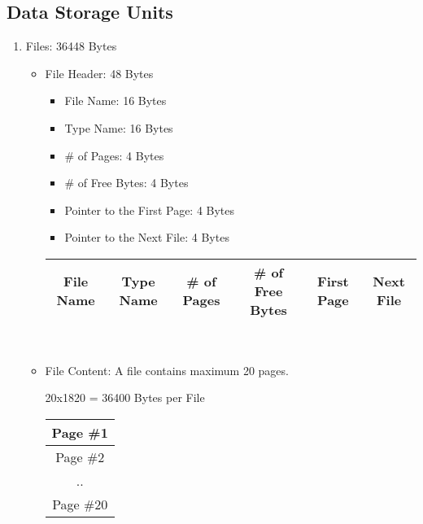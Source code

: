 \documentclass[12pt]{article}
\begin{document}
\subsection{Data Storage Units}
\begin{enumerate}
    \item Files: 36448 Bytes
        \begin{itemize}
            \item File Header: 48 Bytes
            \begin{itemize}
                \item File Name: 16 Bytes
                \item Type Name: 16 Bytes
                \item \# of Pages: 4 Bytes
                \item \# of Free Bytes: 4 Bytes
                \item Pointer to the First Page: 4 Bytes
                \item Pointer to the Next File: 4 Bytes
            \end{itemize}
            
            \begin{tabular}{|c|c|c|c|c|c|}
                \hline
                File Name & Type Name & \# of Pages & \# of Free Bytes & First Page & Next File \\
                \hline
            \end{tabular}
            \\
            \item File Content: A file contains maximum 20 pages.
            \begin{center}
            20x1820 = 36400 Bytes per File
            \end{center}
        \begin{center}
                \begin{tabular}{|c|}
                    \hline
                    Page \#1 \\
                    \hline
                    Page \#2 \\
                    \hline
                    .. \\
                    \hline
                    Page \#20 \\
                    \hline
                \end{tabular}
                \end{center}

        \end{itemize}
        

\end{enumerate}
\end{document}

